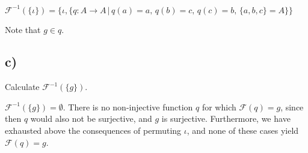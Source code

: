 \documentclass{article}
\begin{document}
$\mathcal{F}^{-1}(\{\iota\}) = \{\iota, \{q: A \rightarrow A \, |\, q(a) = a,\, q(b) = c,\, q(c) = b,\, \{a, b, c\} = A\}\}$

Note that $g \in q$. 

\subsection*{c)}

Calculate $\mathcal{F}^{-1}(\{g\})$.

$\mathcal{F}^{-1}(\{g\}) = \emptyset$. There is no non-injective function $q$ for which $\mathcal{F}(q) = g$, since then $q$ would also not be surjective, and $g$ is surjective. Furthermore, we have exhausted above the consequences of permuting $\iota$, and none of these cases yield $\mathcal{F}(q) = g$.
\end{document}

